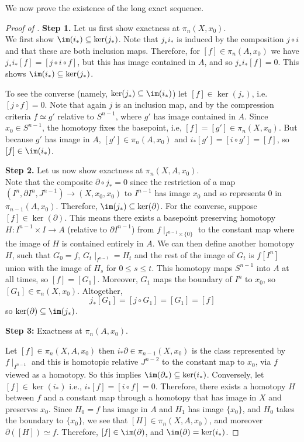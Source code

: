 \documentclass[ma3408.tex]{subfiles}
\begin{document}
We now prove the existence of the long exact sequence.
\begin{proof}[Proof of ]
	\textbf{Step 1. }Let us first show exactness at $\pi_n(X,x_0)$. \\

	We first show $\im(i_*) \subseteq \ker(j_*)$. Note that $j_*i_*$ is induced by the composition $j \circ i$ and that these are both inclusion maps. Therefore, for $[f] \in \pi_n(A,x_0)$ we have $j_*i_*[f] = [j \circ i \circ f]$, but this has image contained in $A$, and so $j_*i_*[f] = 0$. This shows $\im(i_*) \subseteq \ker(j_*)$. 

	To see the converse (namely, $\ker(j_*) \subseteq \im(i_*)$) let $[f] \in \ker(j_*)$, i.e. $[j \circ f] = 0$. Note that again $j$ is an inclusion map, and by the compression criteria $f \simeq g'$ relative to $S^{n-1}$, where $g'$ has image contained in $A$. Since $x_0 \in S^{n-1}$, the homotopy fixes the basepoint, i.e, $[f] = [g'] \in \pi_n(X,x_0)$. But because $g'$ has image in $A$, $[g'] \in \pi_n(A,x_0)$ and $i_*[g'] = [i \circ g'] = [f]$, so $[f] \in \im(i_*)$. 

	\textbf{Step 2. } Let us now show exactness at $\pi_n(X,A,x_0)$. \\

	Note that the composite $\partial \circ j_* = 0$ since the restriction of a map $(I^n,\partial I^n,J^{n-1}) \to (X,x_0,x_0)$ to $I^{n-1}$ has image $x_0$ and so represents $0$ in $\pi_{n-1}(A,x_0)$. Therefore, $\im(j_*) \subseteq \ker(\partial)$. For the converse, suppose $[f] \in \ker(\partial)$. This means there exists a basepoint preserving homotopy $H \colon I^{n-1} \times I \to A$ (relative to $\partial I^{n-1}$) from $f \mid_{I^{n-1} \times \{ 0 \}}$ to the constant map where the image of $H$ is contained entirely in $A$. We can then define another homotopy $H$, such that $G_0 = f$, $G_t \mid_{I^{n-1}} = H_t$ and the rest of the image of $G_t$ is $f[I^n]$ union with the image of $H_s$ for $0 \le s \le t$. This homotopy maps $S^{n-1}$ into $A$ at all times, so $[f] = [G_1]$. Moreover, $G_1$ maps the boundary of $I^n$ to $x_0$, so $[G_1] \in \pi_n(X,x_0)$. Altogether, 
	\[
j_*[G_1] = [j \circ G_1] = [G_1] = [f]
	\]
	so $\ker(\partial) \subseteq \im(j_*)$. 


\textbf{Step 3:} Exactness at $\pi_n(A,x_0)$.
	
	Let $[f] \in \pi_n(X,A,x_0)$ then $i_*\partial \in \pi_{n-1}(X,x_0)$ is the class represented by $f \mid_{I^{n-1}}$ and this is homotopic relative $J^{n-2}$ to the constant map to $x_0$, via $f$ viewed as a homotopy. So this implies $\im(\partial_*) \subseteq \ker(i_*)$. Conversely, let $[f] \in \ker(i_*)$ i.e., $i_*[f]= [i \circ f]= 0$. Therefore, there exists a homotopy $H$ between $f$ and a constant map through a homotopy that has image in $X$ and preserves $x_0$. Since $H_0 = f$ has image in $A$ and $H_1$ has image $\{x_0\}$, and $H_0$ takes the boundary to $\{ x_0 \}$, we see that $[H] \in \pi_n(X,A,x_0)$, and moreover $\partial([H]) \simeq f$. Therefore, $[f] \in \im(\partial)$, and $\im(\partial) = \ker(i_*)$. 
\end{proof}
\end{document}
